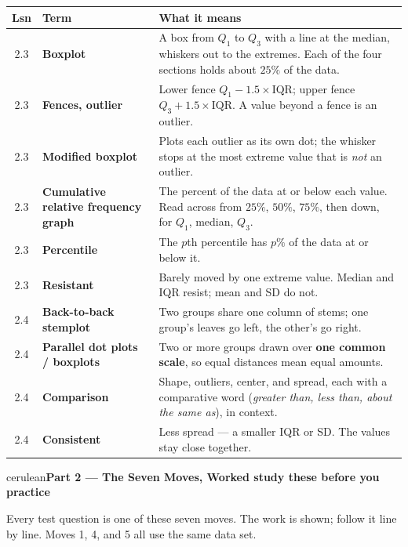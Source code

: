 \documentclass[10pt]{article}
\newcommand{\parthead}[1]{%
  \vspace{6pt}\noindent
  \begin{headlinebox}{cerulean}{\color{white}\bfseries #1}\end{headlinebox}%
  \vspace{4pt}}
\begin{document}
\vspace{4pt}
\boxguard[14]
\begin{tabularx}{\linewidth}{@{} c >{\raggedright\bfseries}p{3.3cm} X @{}}
\rowcolor{frost}
\textbf{Lsn} & \textbf{Term} & \textbf{What it means} \\
\midrule
2.3 & Boxplot & A box from $Q_1$ to $Q_3$ with a line at the median, whiskers out to the
      extremes. Each of the four sections holds about $25\%$ of the data. \\
2.3 & Fences, outlier & Lower fence $Q_1 - 1.5 \times \text{IQR}$; upper fence
      $Q_3 + 1.5 \times \text{IQR}$. A value beyond a fence is an outlier. \\
2.3 & Modified boxplot & Plots each outlier as its own dot; the whisker stops at the most
      extreme value that is \emph{not} an outlier. \\
2.3 & Cumulative relative frequency graph & The percent of the data at or below each value.
      Read across from $25\%$, $50\%$, $75\%$, then down, for $Q_1$, median, $Q_3$. \\
2.3 & Percentile & The $p$th percentile has $p\%$ of the data at or below it. \\
2.3 & Resistant & Barely moved by one extreme value. Median and IQR resist; mean and SD do
      not. \\
2.4 & Back-to-back stemplot & Two groups share one column of stems; one group's leaves go
      left, the other's go right. \\
2.4 & Parallel dot plots / boxplots & Two or more groups drawn over \textbf{one common scale},
      so equal distances mean equal amounts. \\
2.4 & Comparison & Shape, outliers, center, and spread, each with a comparative word
      (\emph{greater than, less than, about the same as}), in context. \\
2.4 & Consistent & Less spread --- a smaller IQR or SD. The values stay close together. \\
\end{tabularx}
\normalsize

\vspace{4pt}
\boxguard[14]
\parthead{Part 2 --- The Seven Moves, Worked \hfill study these before you practice}

\small
Every test question is one of these seven moves. The work is shown; follow it line by line.
Moves 1, 4, and 5 all use the same data set.
\end{document}
